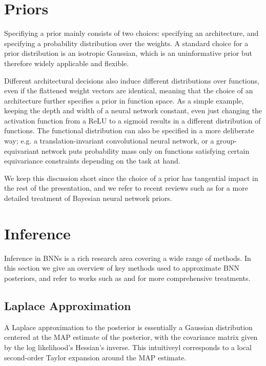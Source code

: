 \section{Priors}

Specifiying a prior mainly consists of two choices: specifying an architecture, and specifying a probability distribution over the weights. A standard choice for a prior distribution is an isotropic Gaussian, which is an uninformative prior but therefore widely applicable and flexible. 

Different architectural decisions also induce different distributions over functions, even if the flattened weight vectors are identical, meaning that the choice of an architecture further specifies a prior in function space. As a simple example, keeping the depth and width of a neural network constant, even just changing the activation function from a ReLU to a sigmoid results in a different distribution of functions. The functional distribution can also be specified in a more deliberate way; e.g. a translation-invariant convolutional neural network, or a group-equivariant network \citep{cohenGroupEquivariantConvolutional2016} puts probability mass only on functions satisfying certain equivariance constraints depending on the task at hand. 

We keep this discussion short since the choice of a prior has tangential impact in the rest of the presentation, and we refer to recent reviews such as \citep{fortuinPriorsBayesianDeep2022} for a more detailed treatment of Bayesian neural network priors. 

\section{Inference} \label{section:bayesian_inference}

Inference in BNNs is a rich research area covering a wide range of methods. In this section we give an overview of key methods used to approximate BNN posteriors, and refer to works such as \citep{arbelPrimerBayesianNeural2023} and \citep{murphyProbabilisticMachineLearning2023} for more comprehensive treatments. 

\subsection{Laplace Approximation}

A Laplace approximation to the posterior \citep{mackayPracticalBayesianFramework1992} is essentially a Gaussian distribution centered at the MAP estimate of the posterior, with the covariance matrix given by the log likelihood's Hessian's inverse. This intuitiveyl corresponds to a local second-order Taylor expansion around the MAP estimate. 


